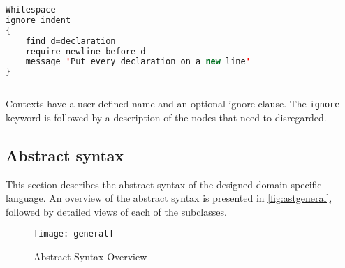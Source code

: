 \begin{sourcecode}
\begin{lstlisting}[style=mono,language=Java]
Whitespace
ignore indent 
{
    find d=declaration
    require newline before d
    message 'Put every declaration on a new line'
}
\end{lstlisting}
\end{sourcecode}

Contexts have a user-defined name and an optional ignore clause. The \texttt{ignore} keyword is
followed by a description of the nodes that need to disregarded.

\subsection{Abstract syntax}

This section describes the abstract syntax of the designed domain-specific language. An overview of
the abstract syntax is presented in \autoref{fig:astgeneral}, followed by detailed views of each
of the subclasses.

\begin{figure}[h!]
  \centering
  \caption{Abstract Syntax Overview}
  \label{fig:astgeneral}
  \texttt{[image: general]}
\end{figure}


